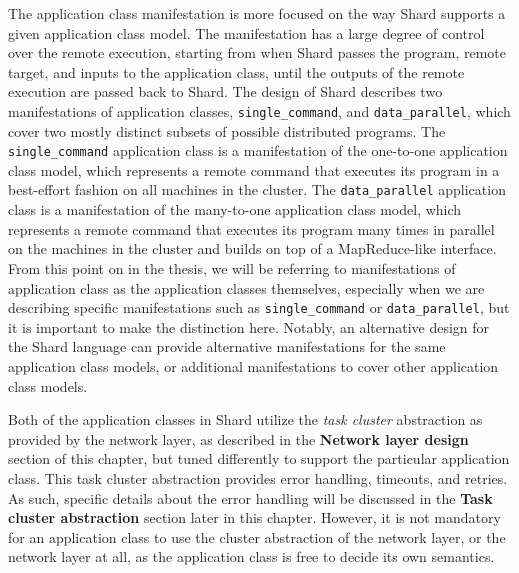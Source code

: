 \documentclass[oneside]{report}
\begin{document}
The application class manifestation is more focused on the way Shard supports a given application class model.
The manifestation has a large degree of control over the remote execution, starting from when Shard passes the program, remote target, and inputs to the application class, until the outputs of the remote execution are passed back to Shard.
The design of Shard describes two manifestations of application classes, \texttt{single\_command}, and \texttt{data\_parallel}, which cover two mostly distinct subsets of possible distributed programs.
The \texttt{single\_command} application class is a manifestation of the one-to-one application class model, which represents a remote command that executes its program in a best-effort fashion on all machines in the cluster.
The \texttt{data\_parallel} application class is a manifestation of the many-to-one application class model, which represents a remote command that executes its program many times in parallel on the machines in the cluster and builds on top of a MapReduce-like interface.
From this point on in the thesis, we will be referring to manifestations of application class as the application classes themselves, especially when we are describing specific manifestations such as \texttt{single\_command} or \texttt{data\_parallel}, but it is important to make the distinction here.
Notably, an alternative design for the Shard language can provide alternative manifestations for the same application class models, or additional manifestations to cover other application class models.


Both of the application classes in Shard utilize the \textit{task cluster} abstraction as provided by the network layer, as described in the \textbf{Network layer design} section of this chapter, but tuned differently to support the particular application class.
This task cluster abstraction provides error handling, timeouts, and retries.
As such, specific details about the error handling will be discussed in the \textbf{Task cluster abstraction} section later in this chapter.
However, it is not mandatory for an application class to use the cluster abstraction of the network layer, or the network layer at all, as the application class is free to decide its own semantics.
\end{document}
